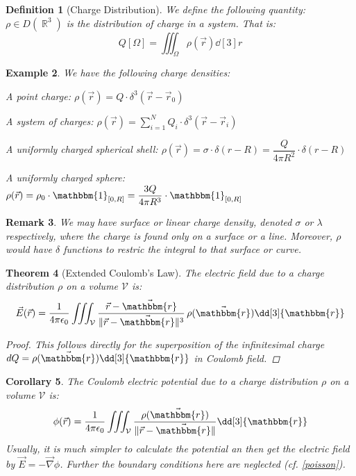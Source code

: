 \documentclass[12pt]{article}
\renewcommand{\grad}{\vec{\nabla}}
\DeclareMathOperator{\R}{\mathbb{R}}
\newcommand*{\rv}{\vec{r}}
\newcommand*{\ir}{\mathbbm{r}}
\newcommand*{\irv}{\vec{\mathbbm{r}}}
\newcommand*{\ind}{\mathbbm{1}}
\newcommand*{\vE}{\vec{E}}
\newcommand*{\ee}{\epsilon_0}
\newcommand*{\vol}{\mathcal{V}}
\newtheorem{theorem}{Theorem}[subsection]
\newtheorem{definition}[theorem]{Definition}
\newtheorem{corollary}[theorem]{Corollary}
\newtheorem{example}[theorem]{Example}
\newtheorem{remark}[theorem]{Remark}
\begin{document}
\begin{definition}[Charge Distribution]
  We define the following quantity: $\rho\in D(\R^3)$ is the distribution of charge in a system. That is:
  $$Q[\Omega]=\iiint_\Omega \rho(\rv)\dd[3]{r}$$
\end{definition}

\begin{example}
  We have the following charge densities:
  \begin{compactitem}
    \item A point charge: $\rho(\rv)=Q\cdot\delta^3(\rv-\rv_0)$
    \item A system of charges: $\rho(\rv)=\sum_{i=1}^N Q_i\cdot\delta^3(\rv-\rv_i)$
    \item A uniformly charged spherical shell: $\rho(\rv)=\sigma\cdot\delta(r-R)=\dfrac{Q}{4\pi R^2}\cdot\delta(r-R)$
    \item A uniformly charged sphere: $\rho(\rv)=\rho_0\cdot \ind_{[0,R]}=\dfrac{3Q}{4\pi R^3}\cdot \ind_{[0,R]}$
  \end{compactitem}
\end{example}

\begin{remark}
  We may have surface or linear charge density, denoted $\sigma$ or $\lambda$ respectively, where the charge is found only on a surface or a line. Moreover, $\rho$ would have $\delta$ functions to restric the integral to that surface or curve.
\end{remark}

\begin{theorem}[Extended Coulomb's Law]
  \label{coulomb}
  The electric field due to a charge distribution $\rho$ on a volume $\vol$ is: $$\vE(\rv)=\frac{1}{4\pi\ee}\iiint_{\vol}\frac{\rv-\irv}{\|\rv-\irv\|^3}\,\rho(\irv)\dd[3]{\ir}$$
  \begin{proof}
    This follows directly for the superposition of the infinitesimal charge $dQ=\rho(\irv)\dd[3]{\ir}$ in Coulomb field.
  \end{proof}
\end{theorem}

\begin{corollary}
  \label{potential_formula}
  The Coulomb electric potential due to a charge distribution $\rho$ on a volume $\vol$ is: $$\phi(\rv)=\frac{1}{4\pi\ee}\iiint_{\vol}\frac{\rho(\irv)}{\|\rv-\irv\|}\dd[3]{\ir}$$
  Usually, it is much simpler to calculate the potential an then get the electric field by $\vE=-\grad\phi$. Further the boundary conditions here are neglected (cf. \ref{poisson}).
\end{corollary}
\end{document}
